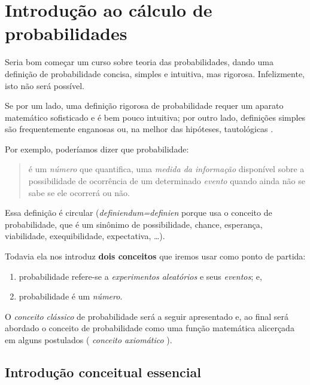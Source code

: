 \documentclass[
]{book}
\providecommand{\tightlist}{%
  \setlength{\itemsep}{0pt}\setlength{\parskip}{0pt}}
\begin{document}
\hypertarget{introduuxe7uxe3o-ao-cuxe1lculo-de-probabilidades}{%
\chapter{Introdução ao cálculo de probabilidades}\label{introduuxe7uxe3o-ao-cuxe1lculo-de-probabilidades}}

Seria bom começar um curso sobre teoria das probabilidades, dando uma definição de probabilidade concisa, simples e intuitiva, mas rigorosa. Infelizmente, isto não será possível.

Se por um lado, uma definição rigorosa de probabilidade requer um aparato matemático sofisticado e é bem pouco intuitiva; por outro lado, definições simples são frequentemente enganosas ou, na melhor das hipóteses, tautológicas .

Por exemplo, poderíamos dizer que probabilidade:

\begin{quote}
é um \emph{número} que quantifica, uma \emph{medida da informação} disponível sobre a possibilidade de ocorrência de um determinado \emph{evento} quando ainda não se sabe se ele ocorrerá ou não.
\end{quote}

Essa definição é circular (\emph{definiendum=definien} porque usa o conceito de probabilidade, que é um sinônimo de possibilidade, chance, esperança, viabilidade, exequibilidade, expectativa, \dots).

Todavia ela nos introduz \textbf{dois conceitos} que iremos usar como ponto de partida:

\begin{enumerate}
\def\labelenumi{\arabic{enumi}.}
\tightlist
\item
  probabilidade refere-se a \emph{experimentos aleatórios} e seus \emph{eventos}; e,
\item
  probabilidade é um \emph{número}.
\end{enumerate}

O \emph{conceito clássico} de probabilidade será a seguir apresentado e, ao final será abordado o conceito de probabilidade como uma função matemática alicerçada em alguns postulados ( \emph{conceito axiomático} ).

\hypertarget{introduuxe7uxe3o-conceitual-essencial-1}{%
\section{Introdução conceitual essencial}\label{introduuxe7uxe3o-conceitual-essencial-1}}
\end{document}
